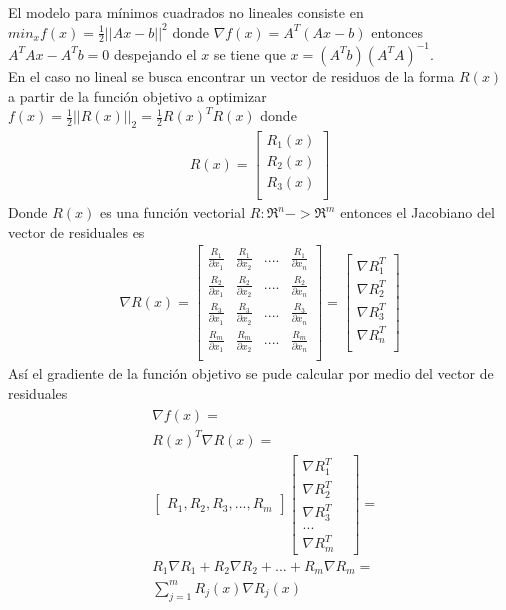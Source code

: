 El modelo para mínimos cuadrados no lineales consiste en $min_x f(x) = \frac{1}{2} ||Ax - b||^2$ donde $\nabla f(x) = A^T (Ax - b)$ entonces $A^T Ax - A^T b = 0$ despejando el $x$ se tiene que $x = (A^T b)(A^T A)^{-1}$. \\
En el caso no lineal se busca encontrar un vector de residuos de la forma $R(x)$ a partir de la función objetivo a optimizar
$f(x) = \frac{1}{2} ||R(x)||_2 = \frac{1}{2} R(x)^T R(x)$
donde 
\begin{align*}
R(x) = \begin{bmatrix}
       R_1(x)  \\
       R_2(x) \\
       R_3(x) \\ 
     \end{bmatrix}
\end{align*}
Donde $R(x)$ es una función vectorial
$R: \Re ^n -> \Re ^m $
entonces el Jacobiano del vector de residuales es
\begin{align*}
\nabla R(x)  = \begin{bmatrix}
       \frac{R_1}{\partial x_1} & \frac{R_1}{\partial x_2} & .... & \frac{R_1}{\partial x_n} \\
       \frac{R_2}{\partial x_1} & \frac{R_2}{\partial x_2} & .... & \frac{R_2}{\partial x_n} \\       
       \frac{R_3}{\partial x_1} & \frac{R_3}{\partial x_2} & .... & \frac{R_3}{\partial x_n} \\
        \frac{R_m}{\partial x_1} & \frac{R_m}{\partial x_2} & .... & \frac{R_m}{\partial x_n} \\
     \end{bmatrix} =
     \begin{bmatrix}
	\nabla R_1^T\\    
	\nabla R_2^T\\    
	\nabla R_3^T\\    
	\nabla R_n^T\\    
     \end{bmatrix} 
\end{align*}
Así el gradiente de la función objetivo se pude calcular por medio del vector de residuales
\begin{align*}
\begin{split}
& \nabla f(x) =  \\ &R(x)^T \nabla R(x) =  \\
    & \begin{bmatrix}
   	    R_1, R_2, R_3,..., R_m 
     \end{bmatrix} 
     \begin{bmatrix}
   		\nabla R_1^T  \\ \nabla R_2^T & \\ \nabla R_3^T & \\ ...\\ \nabla R_m^T 
      	\end{bmatrix} = \\& R_1 \nabla R_1 + R_2 \nabla R_2 + ... + R_m \nabla R_m =
      	\\ & \sum_{j=1}^m R_j(x) \nabla R_j(x)
\end{split}
\end{align*}





